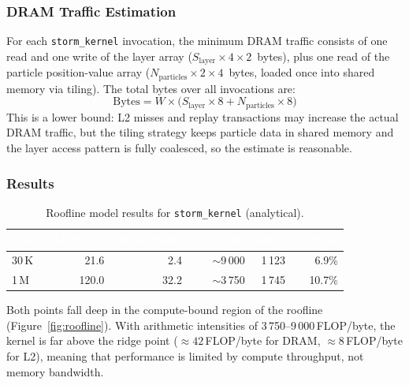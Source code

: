 \documentclass[10pt,dvipsnames,table,twocolumn]{article}
\let\oldtexttt\texttt
\renewcommand{\texttt}[1]{%
  {\small\colorbox{Mist}{\oldtexttt{\textcolor{DarkInk}{#1}}}}%
}
\begin{document}
\subsubsection{DRAM Traffic Estimation}

For each \texttt{storm\_kernel} invocation, the minimum DRAM traffic consists of one read and one write of the layer array ($S_{\text{layer}} \times 4 \times 2$~bytes), plus one read of the particle position-value array ($N_{\text{particles}} \times 2 \times 4$~bytes, loaded once into shared memory via tiling). The total bytes over all invocations are:
%
\begin{equation}\label{eq:bytes}
  \mathrm{Bytes} = W \times \bigl( S_{\text{layer}} \times 8 + N_{\text{particles}} \times 8 \bigr)
\end{equation}
%
This is a lower bound: L2 misses and replay transactions may increase the actual DRAM traffic, but the tiling strategy keeps particle data in shared memory and the layer access pattern is fully coalesced, so the estimate is reasonable.

\subsubsection{Results}

\begin{table}[t]
\centering
\caption{Roofline model results for \texttt{storm\_kernel} (analytical).}\label{tbl:roofline}
\small
\begin{tabular}{@{}lrrrrr@{}}
\rowcolor{TableHead}
\textcolor{white}{\textbf{Test}} &
\textcolor{white}{\textbf{FLOP (G)}} &
\textcolor{white}{\textbf{Bytes (MB)}} &
\textcolor{white}{\textbf{AI (F/B)}} &
\textcolor{white}{\textbf{GF/s}} &
\textcolor{white}{\textbf{\% Peak}} \\
\midrule
30\,K  & 21.6  & 2.4   & ${\sim}$9\,000  & 1\,123 & 6.9\%  \\
\rowcolor{TableRowAlt}
1\,M   & 120.0 & 32.2  & ${\sim}$3\,750  & 1\,745 & 10.7\% \\
\bottomrule
\end{tabular}
\end{table}

Both points fall deep in the compute-bound region of the roofline (Figure~\ref{fig:roofline}). With arithmetic intensities of 3\,750--9\,000\,FLOP/byte, the kernel is far above the ridge point ($\approx 42$\,FLOP/byte for DRAM, $\approx 8$\,FLOP/byte for L2), meaning that performance is limited by compute throughput, not memory bandwidth.
\end{document}
